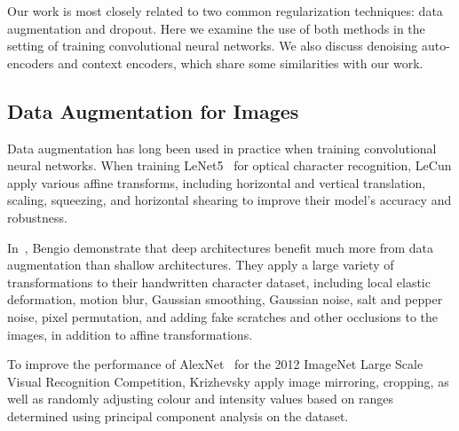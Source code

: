 \documentclass[10pt,twocolumn,letterpaper]{article}
\begin{document}
Our work is most closely related to two common regularization techniques: data augmentation and dropout. Here we examine the use of both methods in the setting of training convolutional neural networks. We also discuss denoising auto-encoders and context encoders, which share some similarities with our work.

\subsection{Data Augmentation for Images}


Data augmentation has long been used in practice when training convolutional neural networks. When training LeNet5~\cite{lecun1998gradient} for optical character recognition, LeCun \etal{} apply various affine transforms, including horizontal and vertical translation, scaling, squeezing, and horizontal shearing to improve their model's accuracy and robustness.

In~\cite{bengio2011deep}, Bengio \etal{} demonstrate that deep architectures benefit much more from data augmentation than shallow architectures. They apply a large variety of transformations to their handwritten character dataset, including local elastic deformation, motion blur, Gaussian smoothing, Gaussian noise, salt and pepper noise, pixel permutation, and adding fake scratches and other occlusions to the images, in addition to affine transformations.

To improve the performance of AlexNet~\cite{krizhevsky2012imagenet} for the 2012 ImageNet Large Scale Visual Recognition Competition, Krizhevsky \etal{} apply image mirroring, cropping, as well as randomly adjusting colour and intensity values based on ranges determined using principal component analysis on the dataset.
\end{document}
